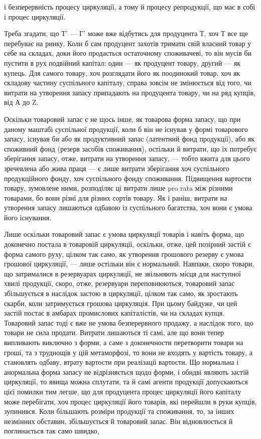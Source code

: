 \parcont{}  %
і безперервність процесу циркуляції, а тому й процесу репродукції, що
має в собі і процес циркуляції.

Треба згадати, що Т' — Г' може вже відбутись для продуцента Т,
хоч Т все ще перебуває на ринку. Коли б сам продуцент захотів тримати
свій власний товар у себе на складах, доки його продасться остаточному
споживачеві, то він мусів би пустити в рух подвійний капітал:
один — як продуцент товару, другий — як купець. Для самого товару,
хоч розглядати його як поодинокий товар, хоч як складову частину
суспільного капіталу, справа зовсім не змінюється від того, чи витрати
на утворення запасу припадають на продуцента товару, чи на ряд купців,
від А до Z.

Оскільки товаровий запас є не щось інше, як товарова форма запасу,
що при даному маштабі суспільної продукції, коли б він не існував у
формі товарового запасу, існував би або як продуктивний запас (латентний
фонд продукції), або як споживний фонд (резерв засобів споживання),
остільки й витрати, що їх потребує зберігання запасу, отже, витрати на
утворення запасу, — тобто вжита для цього зречевлена або жива праця —
є лише витрати зберігання хоч суспільного продукційного фонду,
хоч суспільного фонду споживання. Підвищення вартости товару,
зумовлене ними, розподіляє ці витрати лише pro rata між різними
товарами, бо вони різні для різних сортів товару. Як і раніш,
витрати на утворення запасу лишаються одбавою із суспільного багатства,
хоч вони є умова його існування.

Лише оскільки товаровий запас є умова циркуляції товарів і навіть
форма, що доконечно постала в товаровій циркуляції, оскільки, отже,
цей позірний застій є форма самого руху, цілком так само, як утворення
грошового резерву є умова грошової циркуляції, — лише остільки
він є нормальний. Навпаки, скоро товари, що затрималися в резервуарах
циркуляції, не звільняють місця для наступної хвилі продукції,
скоро, отже, резервуари переповнюються, товаровий запас збільшується
в наслідок застою в циркуляції, цілком так само, як зростають
скарби, коли затримується грошова циркуляція. При цьому
байдуже, чи цей застій постає в амбарах промислових капіталістів, чи
на складах купця. Товаровий запас тоді є вже не умова безперервного
продажу, а наслідок того, що товари не сила продати. Витрати лишаються
ті самі, але що вони тепер випливають виключно з форми, а саме з
доконечности перетворити товари на гроші, та з труднощів у цій метаморфозі,
то вони не входять у вартість товару, а становлять одбаву, втрату
вартости при реалізації вартости. Що нормальна і анормальна форма
запасу не відрізняється щодо форми, і обидві являють застій циркуляції,
то явища можна сплутати, та й самі агенти продукції допускаються
цієї помилки тим легше, що для продуцента процес циркуляції
його капіталу може перебігати, хоч процес циркуляції його товарів,
які перейшли в руки купців, зупинився. Коли більшають розміри
продукції та споживання, то, за інших незмінних обставин, збільшується
й товаровий запас. Він відновлюється й поглинається так само швидко,
\parbreak{}  %
